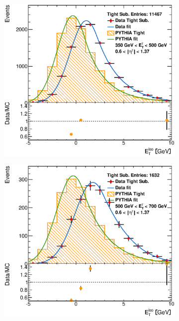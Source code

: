 \documentclass[12pt, twoside]{article}
\numberwithin{equation}{section}
\numberwithin{figure}{section}
\newenvironment{changemargin}[2]{%
\begin{list}{}{%
\setlength{\topsep}{0pt}%
\setlength{\leftmargin}{#1}%
\setlength{\rightmargin}{#2}%
\setlength{\listparindent}{\parindent}%
\setlength{\itemindent}{\parindent}%
\setlength{\parsep}{\parskip}%
}%
\item[]}{\end{list}}
\begin{document}
\begin{figure}[H]
\begin{changemargin}{-1.0cm}{-0.75cm}
\begin{changemargin}{-0.75cm}{-1.0cm}
        \begin{subfigure}[b]{0.27\textwidth}
            \includegraphics[width=\textwidth]{./images/EtISOCorrection/T_MC_FITS-24(10GeV)(Before).eps}
        \end{subfigure}
        \begin{subfigure}[b]{0.27\textwidth}
            \includegraphics[width=\textwidth]{./images/EtISOCorrection/T_MC_FITS-25(10GeV)(Before).eps}

\end{subfigure}
\end{changemargin}
\end{changemargin}
\end{figure}
\end{document}
